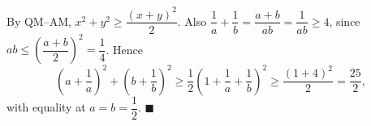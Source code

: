 By QM--AM, $x^2+y^2\ge\dfrac{(x+y)^2}{2}$. Also $\dfrac1a+\dfrac1b=\dfrac{a+b}{ab}=\dfrac1{ab}\ge4$, since $ab\le\left(\dfrac{a+b}{2}\right)^2=\dfrac14$. Hence
\[\left(a+\dfrac1a\right)^2+\left(b+\dfrac1b\right)^2\ge\dfrac12\left(1+\dfrac1a+\dfrac1b\right)^2\ge\dfrac{(1+4)^2}{2}=\dfrac{25}{2},\]
with equality at $a=b=\dfrac12$. $\blacksquare$
